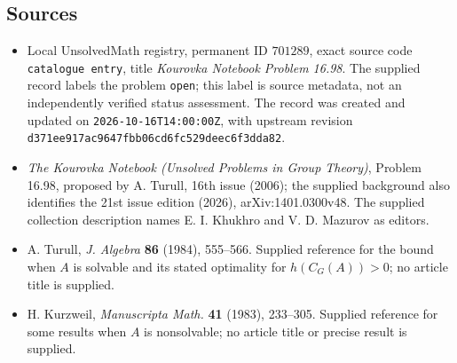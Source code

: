 \documentclass[11pt]{article}
\begin{document}
\subsection{Sources}
\begin{itemize}
\item Local UnsolvedMath registry, permanent ID \(701289\), exact source code \texttt{catalogue entry}, title \emph{Kourovka Notebook Problem 16.98}. The supplied record labels the problem \texttt{open}; this label is source metadata, not an independently verified status assessment. The record was created and updated on \texttt{2026-10-16T14:00:00Z}, with upstream revision \texttt{d371ee917ac9647fbb06cd6fc529deec6f3dda82}.
\item \emph{The Kourovka Notebook (Unsolved Problems in Group Theory)}, Problem 16.98, proposed by A. Turull, 16th issue (2006); the supplied background also identifies the 21st issue edition (2026), arXiv:1401.0300v48. The supplied collection description names E. I. Khukhro and V. D. Mazurov as editors.
\item A. Turull, \emph{J. Algebra} \textbf{86} (1984), 555--566. Supplied reference for the bound when \(A\) is solvable and its stated optimality for \(h(C_G(A))>0\); no article title is supplied.
\item H. Kurzweil, \emph{Manuscripta Math.} \textbf{41} (1983), 233--305. Supplied reference for some results when \(A\) is nonsolvable; no article title or precise result is supplied.
\end{itemize}
\end{document}
